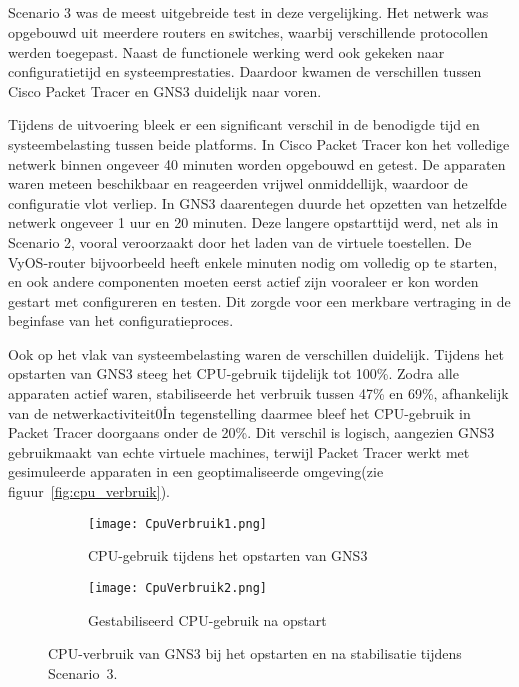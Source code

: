 \subsection{}

Scenario 3 was de meest uitgebreide test in deze vergelijking. Het netwerk was opgebouwd uit meerdere routers en switches, waarbij verschillende protocollen werden toegepast. Naast de functionele werking werd ook gekeken naar configuratietijd en systeemprestaties. Daardoor kwamen de verschillen tussen Cisco Packet Tracer en GNS3 duidelijk naar voren.

\vspace{0.3cm}

Tijdens de uitvoering bleek er een significant verschil in de benodigde tijd en systeembelasting tussen beide platforms. In Cisco Packet Tracer kon het volledige netwerk binnen ongeveer 40 minuten worden opgebouwd en getest. De apparaten waren meteen beschikbaar en reageerden vrijwel onmiddellijk, waardoor de configuratie vlot verliep. In GNS3 daarentegen duurde het opzetten van hetzelfde netwerk ongeveer 1 uur en 20 minuten. Deze langere opstarttijd werd, net als in Scenario 2, vooral veroorzaakt door het laden van de virtuele toestellen. De VyOS-router bijvoorbeeld heeft enkele minuten nodig om volledig op te starten, en ook andere componenten moeten eerst actief zijn vooraleer er kon worden gestart met configureren en testen. Dit zorgde voor een merkbare vertraging in de beginfase van het configuratieproces.

\vspace{0.3cm}



Ook op het vlak van systeembelasting waren de verschillen duidelijk. Tijdens het opstarten van GNS3 steeg het CPU-gebruik tijdelijk tot 100\%. Zodra alle apparaten actief waren, stabiliseerde het verbruik tussen 47\% en 69\%, afhankelijk van de netwerkactiviteit0\. In tegenstelling daarmee bleef het CPU-gebruik in Packet Tracer doorgaans onder de 20\%. Dit verschil is logisch, aangezien GNS3 gebruikmaakt van echte virtuele machines, terwijl Packet Tracer werkt met gesimuleerde apparaten in een geoptimaliseerde omgeving(zie figuur~\ref{fig:cpu_verbruik}).

\vspace{0.3cm}

\begin{figure}[H]
    \centering
    \begin{subfigure}[b]{0.48\textwidth}
        \texttt{[image: CpuVerbruik1.png]}
        \caption{CPU-gebruik tijdens het opstarten van GNS3}
        \label{fig:cpu_opstart}
    \end{subfigure}
    \hfill
    \begin{subfigure}[b]{0.48\textwidth}
        \texttt{[image: CpuVerbruik2.png]}
        \caption{Gestabiliseerd CPU-gebruik na opstart}
        \label{fig:cpu_na_opstart}
    \end{subfigure}
    \caption[CPU-verbruik van GNS3 tijdens Scenario 3.]{\label{fig:cpu_gns3}CPU-verbruik van GNS3 bij het opstarten en na stabilisatie tijdens Scenario~3.}
\end{figure}


